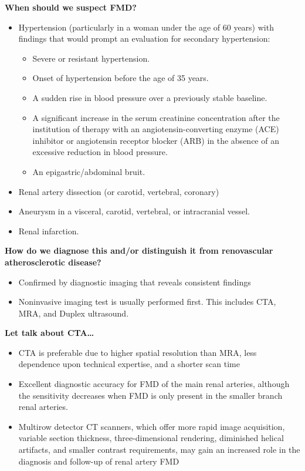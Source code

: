 \documentclass[
]{book}
\begin{document}
\textbf{When should we suspect FMD?}

\begin{itemize}
\item
  Hypertension (particularly in a woman under the age of 60 years)
  with findings that would prompt an evaluation for secondary
  hypertension:

  \begin{itemize}
  \item
    Severe or resistant hypertension.
  \item
    Onset of hypertension before the age of 35 years.
  \item
    A sudden rise in blood pressure over a previously stable
    baseline.
  \item
    A significant increase in the serum creatinine concentration
    after the institution of therapy with an angiotensin-converting
    enzyme (ACE) inhibitor or angiotensin receptor blocker (ARB) in
    the absence of an excessive reduction in blood pressure.
  \item
    An epigastric/abdominal bruit.
  \end{itemize}
\item
  Renal artery dissection (or carotid, vertebral, coronary)
\item
  Aneurysm in a visceral, carotid, vertebral, or intracranial vessel.
\item
  Renal infarction.
\end{itemize}

\textbf{How do we diagnose this and/or distinguish it from renovascular
atherosclerotic disease?}

\begin{itemize}
\item
  Confirmed by diagnostic imaging that reveals consistent findings
\item
  Noninvasive imaging test is usually performed first. This includes
  CTA, MRA, and Duplex ultrasound.
\end{itemize}

\textbf{Let talk about CTA\ldots{}}

\begin{itemize}
\item
  CTA is preferable due to higher spatial resolution than MRA, less
  dependence upon technical expertise, and a shorter scan time
\item
  Excellent diagnostic accuracy for FMD of the main renal arteries,
  although the sensitivity decreases when FMD is only present in the
  smaller branch renal arteries.
\item
  Multirow detector CT scanners, which offer more rapid image
  acquisition, variable section thickness, three-dimensional
  rendering, diminished helical artifacts, and smaller contrast
  requirements, may gain an increased role in the diagnosis and
  follow-up of renal artery FMD
\end{itemize}
\end{document}
